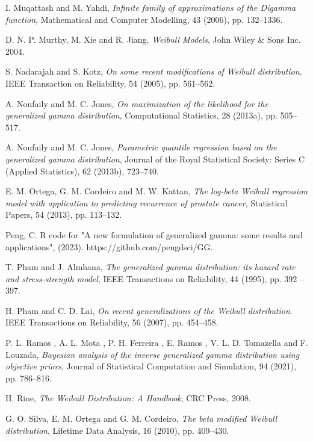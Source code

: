 \documentclass{ps}
\theoremstyle{plain}%
\theoremstyle{definition}
\theoremstyle{remark}
\begin{document}
\begin{thebibliography}{}
	I. Muqattash and  M. Yahdi, \emph{Infinite family of approximations of the Digamma function}, Mathematical and Computer Modelling,  43 (2006), pp. 132--1336.
	
	D. N. P. Murthy, M.  Xie  and R.  Jiang,  \emph{Weibull Models}, John Wiley \& Sons Inc. 2004.
	
	S. Nadarajah and  S. Kotz, \emph{On some recent modifications of Weibull distribution}. IEEE Transaction on Reliability, 54 (2005),  pp. 561--562.
	
	A. Noufaily and M. C. Jones,  \emph{On maximization of the likelihood for the generalized gamma distribution}, Computational Statistics, 28 (2013a),  pp. 505--517.
	
	A. Noufaily and M. C. Jones,  \emph{Parametric quantile regression based on the generalized gamma distribution}, Journal of the Royal Statistical Society: Series C (Applied Statistics), 62 (2013b), 723--740.
	
	E. M. Ortega,  G. M. Cordeiro and M. W. Kattan,  \emph{The log-beta Weibull regression model with application to predicting recurrence of prostate cancer}, Statistical Papers, 54 (2013),  pp. 113--132.
	
	
	Peng, C. R code for "A new formulation of generalized gamma: some results and applications", (2023). https://github.com/pengdsci/GG.
	
	
	T. Pham  and J. Almhana,   \emph{The generalized gamma distribution: its hazard rate and stress-strength model}, IEEE Transactions on Reliability, 44 (1995),  pp. 392 --397.
	
	H. Pham and C. D.  Lai,  \emph{On recent generalizations of the Weibull distribution}. IEEE Transactions on Reliability, 56 (2007),  pp. 454--458.
	
	P. L. Ramos , A. L. Mota , P. H. Ferreira , E. Ramos , V. L. D. Tomazella and F. Louzada, \emph{Bayesian analysis of the inverse generalized gamma distribution using objective priors}, Journal of Statistical Computation and Simulation, 94 (2021), pp. 786--816.	
	
	H.  Rine,  \emph{The Weibull Distribution: A Handbook}, CRC Press, 2008.
	
	
	G. O. Silva,  E. M. Ortega and G. M. Cordeiro,  \emph{The beta modified Weibull distribution}, Lifetime Data Analysis, 16 (2010),  pp. 409--430.
	

\end{thebibliography}
\end{document}
